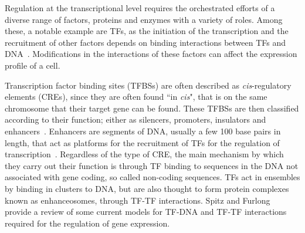 

        Regulation at the transcriptional level requires the orchestrated efforts of a diverse range of factors, proteins and enzymes with a variety of roles. Among these, a notable example are TFs, as the initiation of the transcription and the recruitment of other factors depends on binding interactions between TFs and DNA~\cite{lemon2000orchestrated}. Modifications in the interactions of these factors can affect the expression profile of a cell.
        
        
        Transcription factor binding sites (TFBSs) are often described as \emph{cis}-regulatory elements (CREs), since they are often found ``in \emph{cis}", that is on the same chromosome that their target gene can be found. These TFBSs are then classified according to their function; either as silencers, promoters, insulators and enhancers~\cite{gaszner2006insulators, gross1988nuclease, li1999locus}. 
        Enhancers are segments of DNA, usually a few 100 base pairs in length, that act as platforms for the recruitment of TFs for the regulation of transcription~\cite{spitz2012transcription}. 
        Regardless of the type of CRE, the main mechanism by which they carry out their function is through TF binding to sequences in the DNA not associated with gene coding, so called non-coding sequences. 
        TFs act in ensembles by binding in clusters to DNA, but are also thought to form protein complexes known as enhanceosomes, through TF-TF interactions. Spitz and Furlong~\cite{spitz2012transcription} provide a review of some current models for TF-DNA and TF-TF interactions required for the regulation of gene expression.
        
        
